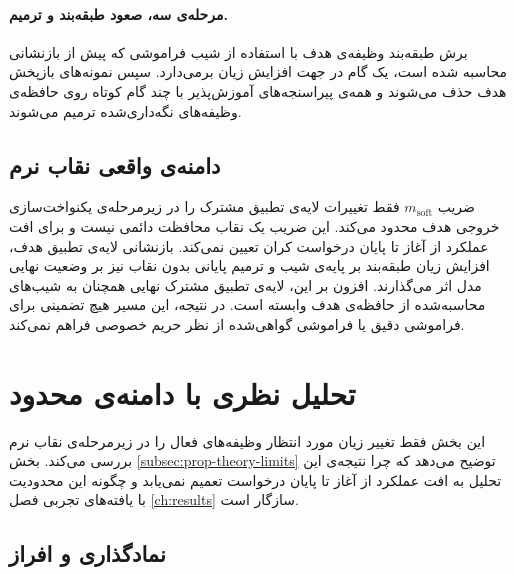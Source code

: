 \paragraph{مرحله‌ی سه، صعود طبقه‌بند و ترمیم.} برش طبقه‌بند وظیفه‌ی هدف با استفاده از شیب فراموشی که پیش از بازنشانی محاسبه شده است، یک گام در جهت افزایش زیان برمی‌دارد. سپس نمونه‌های بازپخش هدف حذف می‌شوند و همه‌ی پیراسنجه‌های آموزش‌پذیر با چند گام کوتاه روی حافظه‌ی وظیفه‌های نگه‌داری‌شده ترمیم می‌شوند.

\subsection{دامنه‌ی واقعی نقاب نرم}
\label{subsec:prop-adapter-scope}

ضریب $m_{\mathrm{soft}}$ فقط تغییرات لایه‌ی تطبیق مشترک را در زیرمرحله‌ی یکنواخت‌سازی خروجی هدف محدود می‌کند. این ضریب یک نقاب محافظت دائمی نیست و برای افت عملکرد از آغاز تا پایان درخواست کران تعیین نمی‌کند. بازنشانی لایه‌ی تطبیق هدف، افزایش زیان طبقه‌بند بر پایه‌ی شیب و ترمیم پایانی بدون نقاب نیز بر وضعیت نهایی مدل اثر می‌گذارند. افزون بر این، لایه‌ی تطبیق مشترک نهایی همچنان به شیب‌های محاسبه‌شده از حافظه‌ی هدف وابسته است. در نتیجه، این مسیر هیچ تضمینی برای فراموشی دقیق یا فراموشی گواهی‌شده از نظر حریم خصوصی فراهم نمی‌کند.

\section{تحلیل نظری با دامنه‌ی محدود}
\label{sec:prop-theory}

این بخش فقط تغییر زیان مورد انتظار وظیفه‌های فعال را در زیرمرحله‌ی نقاب نرم بررسی می‌کند. بخش \ref{subsec:prop-theory-limits} توضیح می‌دهد که چرا نتیجه‌ی این تحلیل به افت عملکرد از آغاز تا پایان درخواست تعمیم نمی‌یابد و چگونه این محدودیت با یافته‌های تجربی فصل \ref{ch:results} سازگار است.

\subsection{نمادگذاری و افراز}
\label{subsec:prop-theory-notation}

